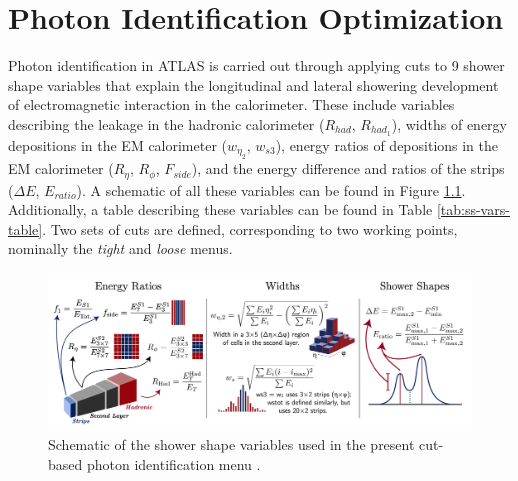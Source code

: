 \chapter{Photon Identification Optimization}

Photon identification in ATLAS is carried out through applying cuts to 9 shower shape variables that explain the longitudinal and lateral showering development of electromagnetic interaction in the calorimeter. These include variables describing the leakage in the hadronic calorimeter ($R_{had}$, $R_{had_1}$), widths of energy depositions in the \gls{EM} calorimeter ($w_{\eta_2}$, $w_{s3}$), energy ratios of depositions in the \gls{EM} calorimeter ($R_{\eta}$, $R_{\phi}$, $F_{side}$), and the energy difference and ratios of the strips ($\Delta E$, $E_{ratio}$). A schematic of all these variables can be found in Figure \ref{fig:ss-vars-schematic}. Additionally, a table describing these variables can be found in Table \ref{tab:ss-vars-table}. Two sets of cuts are defined, corresponding to two working points, nominally the \textit{tight} and \textit{loose} menus. 

\begin{figure}
    \centering
    \includegraphics[width=.98\textwidth]{chapters/chapter4_photonID/images/ss-vars.png}
    \caption[Schematic of the shower shape variables used in the present cut-based photon identification menu.]
    {Schematic of the shower shape variables used in the present cut-based photon identification menu \cite{ss-var-schematic}.}
    \label{fig:ss-vars-schematic}
\end{figure}

